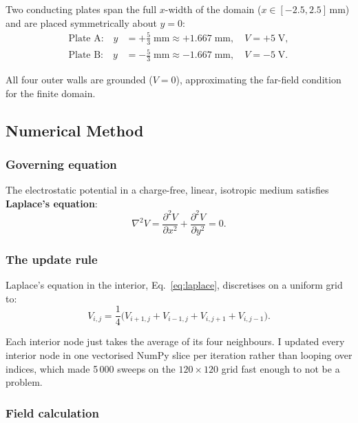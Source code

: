 \documentclass[11pt,a4paper]{article}
\begin{document}
Two conducting plates span the full $x$-width of the domain ($x \in [-2.5, 2.5]$\,mm) and are placed symmetrically about $y=0$:
\begin{align}
\text{Plate A:} \quad y &= +\frac{5}{3}\;\text{mm} \approx +1.667\;\text{mm}, \quad V = +5\;\text{V}, \\
\text{Plate B:} \quad y &= -\frac{5}{3}\;\text{mm} \approx -1.667\;\text{mm}, \quad V = -5\;\text{V}.
\end{align}

All four outer walls are grounded ($V=0$), approximating the far-field condition for the finite domain.

\subsection{Numerical Method}

\subsubsection{Governing equation}

The electrostatic potential in a charge-free, linear, isotropic medium satisfies \textbf{Laplace's equation}:
\begin{equation}
\nabla^2 V = \frac{\partial^2 V}{\partial x^2} + \frac{\partial^2 V}{\partial y^2} = 0.
\label{eq:laplace}
\end{equation}

\subsubsection{The update rule}

Laplace's equation in the interior, Eq.~\eqref{eq:laplace}, discretises on a uniform grid to:
\begin{equation}
\boxed{\;V_{i,j} = \frac{1}{4}\bigl(V_{i+1,j} + V_{i-1,j} + V_{i,j+1} + V_{i,j-1}\bigr).\;}
\label{eq:fivepoint}
\end{equation}

Each interior node just takes the average of its four neighbours. I updated every interior node in one vectorised NumPy slice per iteration rather than looping over indices, which made 5\,000 sweeps on the $120 \times 120$ grid fast enough to not be a problem.

\subsubsection{Field calculation}
\end{document}
